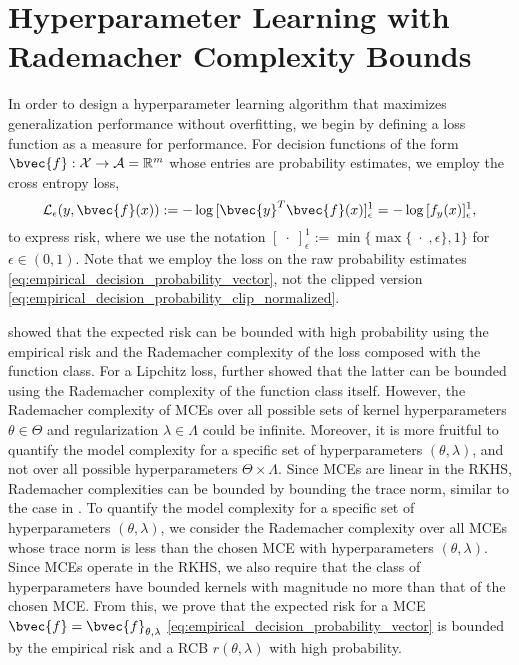 \documentclass[twoside]{article}
\begin{document}
	\section{Hyperparameter Learning with Rademacher Complexity Bounds}
	\label{sec:hyperparameter_learning}
		
		In order to design a hyperparameter learning algorithm that maximizes generalization performance without overfitting, we begin by defining a loss function as a measure for performance. For decision functions of the form $\bvec{f} : \mathcal{X} \to \mathcal{A} = \mathbb{R}^{m}$ whose entries are probability estimates, we employ the cross entropy loss,
		\begin{equation}
		\mathcal{L}_{\epsilon}(y, \bvec{f}(x)) := - \log{ [\bvec{y}^{T} \bvec{f}(x)]_{\epsilon}^{1} } = - \log{ [f_{y}(x)]_{\epsilon}^{1} },
		\label{eq:cross_entropy_loss_copy}
		\end{equation}
		to express risk, where we use the notation $[\;\cdot\;]_{\epsilon}^{1} := \min\{\max\{\;\cdot\;, \epsilon\}, 1\}$ for $\epsilon \in (0, 1)$. Note that we employ the loss on the raw probability estimates \eqref{eq:empirical_decision_probability_vector}, not the clipped version \eqref{eq:empirical_decision_probability_clip_normalized}.
		
		\cite{bartlett2002rademacher} showed that the expected risk can be bounded with high probability using the empirical risk and the Rademacher complexity of the loss composed with the function class. For a Lipchitz loss, \citet{ledoux2013probability} further showed that the latter can be bounded using the Rademacher complexity of the function class itself. However, the Rademacher complexity of \glspl{MCE} over all possible sets of kernel hyperparameters $\theta \in \Theta$ and regularization $\lambda \in \Lambda$ could be infinite. Moreover, it is more fruitful to quantify the model complexity for a specific set of hyperparameters $(\theta, \lambda)$, and not over all possible hyperparameters $\Theta \times \Lambda$. Since \glspl{MCE} are linear in the \gls{RKHS}, Rademacher complexities can be bounded by bounding the trace norm, similar to the case in \cite{yu2014large}. To quantify the model complexity for a specific set of hyperparameters $(\theta, \lambda)$, we consider the Rademacher complexity over all \glspl{MCE} whose trace norm is less than the chosen \gls{MCE} with hyperparameters $(\theta, \lambda)$. Since \glspl{MCE} operate in the \gls{RKHS}, we also require that the class of hyperparameters have bounded kernels with magnitude no more than that of the chosen \gls{MCE}. From this, we prove that the expected risk for a \gls{MCE} $\bvec{f} = \bvec{f}_{\theta, \lambda}$ \eqref{eq:empirical_decision_probability_vector} is bounded by the empirical risk and a \gls{RCB} $r(\theta, \lambda)$ with high probability.
		
\end{document}
